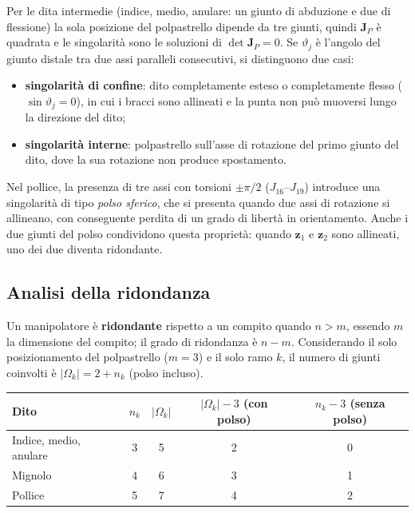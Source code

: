 Per le dita intermedie (indice, medio, anulare: un giunto di abduzione e due di flessione) la sola posizione del polpastrello dipende da tre giunti, quindi $\boldsymbol J_P$ è quadrata e le singolarità sono le soluzioni di $\det\boldsymbol J_P=0$. 
Se $\vartheta_{j}$ è l'angolo del giunto distale tra due assi paralleli consecutivi, si distinguono due casi:
\begin{itemize}
    \item \textbf{singolarità di confine}: dito completamente esteso o completamente flesso ($\sin\vartheta_j=0$), in cui i bracci sono allineati e la punta non può muoversi lungo la direzione del dito;
    \item \textbf{singolarità interne}: polpastrello sull'asse di rotazione del primo giunto del dito, dove la sua rotazione non produce spostamento.
\end{itemize}
Nel pollice, la presenza di tre assi con torsioni $\pm\pi/2$ ($J_{16}$--$J_{19}$) introduce una singolarità di tipo \emph{polso sferico}, che si presenta quando due assi di rotazione si allineano, con conseguente perdita di un grado di libertà in orientamento. 
Anche i due giunti del polso condividono questa proprietà: quando $\boldsymbol z_1$ e $\boldsymbol z_2$ sono allineati, uno dei due diventa ridondante.

\subsection{Analisi della ridondanza}

Un manipolatore è \textbf{ridondante} rispetto a un compito quando $n>m$, essendo $m$ la dimensione del compito; il grado di ridondanza è $n-m$. Considerando il solo posizionamento del polpastrello ($m=3$) e il solo ramo $k$, il numero di giunti coinvolti è $|\Omega_k|=2+n_k$ (polso incluso).

\begin{table}
    \centering
    \renewcommand{\arraystretch}{1.2}
    \begin{tabular}{lcccc}
        \hline
        \textbf{Dito} & $n_k$ & $|\Omega_k|$ & $|\Omega_k|-3$ (con polso) & $n_k-3$ (senza polso) \\ \hline \hline
        Indice, medio, anulare & 3 & 5 & 2 & 0 \\
        Mignolo & 4 & 6 & 3 & 1 \\
        Pollice & 5 & 7 & 4 & 2 \\ \hline
    \end{tabular}
\end{table}

